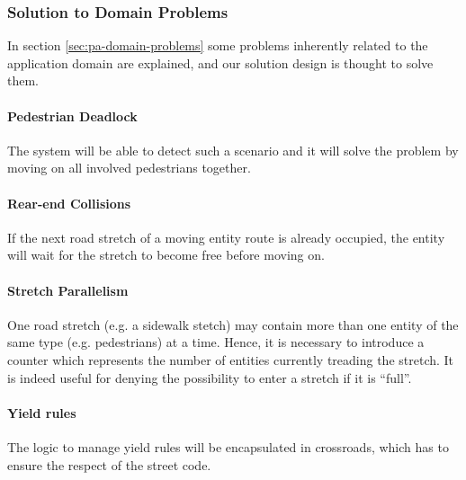 \subsubsection{Solution to Domain Problems}

In section \ref{sec:pa-domain-problems} some problems 
inherently related to the application domain are explained, 
and our solution design is thought to solve them.

\paragraph{Pedestrian Deadlock}
The system will be able to detect such a scenario
and it will solve the problem by moving on
all involved pedestrians together.

\paragraph{Rear-end Collisions} 
If the next road stretch of a moving entity route is already occupied,
the entity will wait for the stretch to become free before moving on.

\paragraph{Stretch Parallelism} 
One road stretch (e.g. a sidewalk stetch) may contain more 
than one entity of the same type (e.g. pedestrians) at a time.
Hence, it is necessary to introduce a counter which represents
the number of entities currently treading the stretch.
It is indeed useful for denying the possibility to enter a stretch if it is ``full''.

\paragraph{Yield rules} 
The logic to manage yield rules will be encapsulated in crossroads, 
which has to ensure the respect of the street code.
